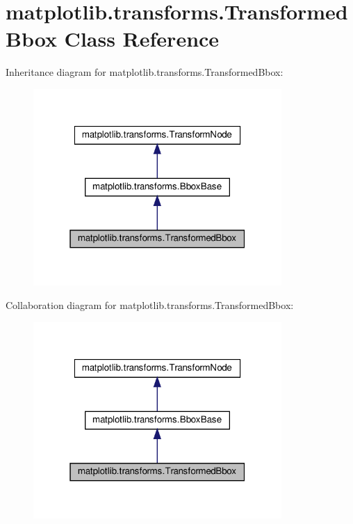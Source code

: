 \hypertarget{classmatplotlib_1_1transforms_1_1TransformedBbox}{}\section{matplotlib.\+transforms.\+Transformed\+Bbox Class Reference}
\label{classmatplotlib_1_1transforms_1_1TransformedBbox}


Inheritance diagram for matplotlib.\+transforms.\+Transformed\+Bbox\+:
\nopagebreak
\begin{figure}[H]
\begin{center}
\leavevmode
\includegraphics[width=268pt]{classmatplotlib_1_1transforms_1_1TransformedBbox__inherit__graph}
\end{center}
\end{figure}


Collaboration diagram for matplotlib.\+transforms.\+Transformed\+Bbox\+:
\nopagebreak
\begin{figure}[H]
\begin{center}
\leavevmode
\includegraphics[width=268pt]{classmatplotlib_1_1transforms_1_1TransformedBbox__coll__graph}
\end{center}
\end{figure}
